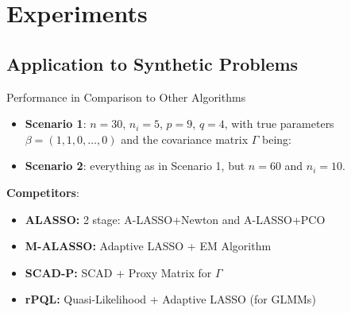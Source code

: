\documentclass[8pt]{beamer}
\begin{document}
\section{Experiments}
\subsection{Application to Synthetic Problems}

\begin{frame}{Performance in Comparison to Other Algorithms}
\begin{itemize}
	\item \textbf{Scenario 1}: $n=30$, $n_i=5$, $p = 9$, $q = 4$, with true parameters $\beta = (1, 1, 0, \dots, 0)$ and the covariance matrix $\Gamma$ being: 
	\item \textbf{Scenario 2}: everything as in Scenario 1, but $n=60$ and $n_i=10$.
\end{itemize}
\textbf{Competitors}:
\begin{itemize}
	\item \textbf{ALASSO:} 2 stage: A-LASSO+Newton and A-LASSO+PCO
	\item \textbf{M-ALASSO:} Adaptive LASSO + EM Algorithm
	\item \textbf{SCAD-P:} SCAD + Proxy Matrix for $\Gamma$
	\item \textbf{rPQL:} Quasi-Likelihood + Adaptive LASSO (for GLMMs)
\end{itemize}
\end{frame}
\end{document}
